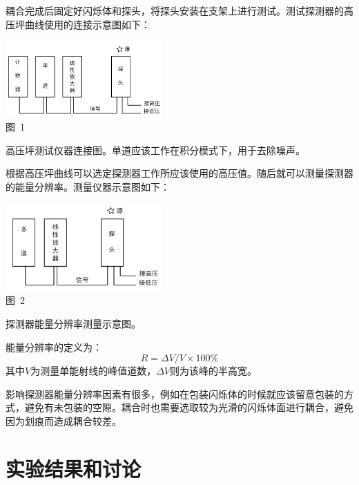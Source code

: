 \documentclass[a4paper,10.0pt,twoside]{npr}
\begin{document}
\begin{multicols}{2}
耦合完成后固定好闪烁体和探头，将探头安装在支架上进行测试。测试探测器的高压坪曲线使用的连接示意图如下：
\begin{center}
   \includegraphics[width=0.45\textwidth]{lianjie.png}
\\
\xiaowu\song 图~1\begin{minipage}[t]{75mm} \quad 高压坪测试仪器连接图。单道应该工作在积分模式下，用于去除噪声。\\[-1mm]\wuhao
\end{minipage}
\end{center}

根据高压坪曲线可以选定探测器工作所应该使用的高压值。随后就可以测量探测器的能量分辨率。测量仪器示意图如下：

\begin{center}
   \includegraphics[width=0.45\textwidth]{lianjie2.png}
\\
\xiaowu\song 图~2\begin{minipage}[t]{75mm} \quad 探测器能量分辨率测量示意图。\\[-1mm]\wuhao
\end{minipage}
\end{center}


能量分辨率的定义为：
\begin{equation}
   R = \Delta V/V\times100\%
\end{equation}
其中$V$为测量单能射线的峰值道数，$\Delta V$则为该峰的半高宽。 

影响探测器能量分辨率因素有很多，例如在包装闪烁体的时候就应该留意包装的方式，避免有未包装的空隙。耦合时也需要选取较为光滑的闪烁体面进行耦合，避免因为划痕而造成耦合较差。

\section{实验结果和讨论}


\end{multicols}
\end{document}
